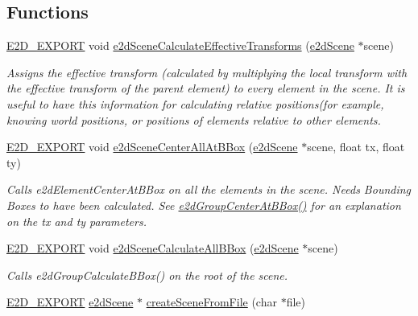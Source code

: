 \subsection*{Functions}
\begin{DoxyCompactItemize}
\item 
\hyperlink{Ez2DS_8h_a9f14e9cb869e1a85fdaba03afcca0df9}{E2\-D\-\_\-\-E\-X\-P\-O\-R\-T} void \hyperlink{group__e2dScene_ga6981f2448904c96723449cb84ffb4d8a}{e2d\-Scene\-Calculate\-Effective\-Transforms} (\hyperlink{structe2dScene}{e2d\-Scene} $\ast$scene)
\begin{DoxyCompactList}\small\item\em Assigns the effective transform (calculated by multiplying the local transform with the effective transform of the parent element) to every element in the scene. It is useful to have this information for calculating relative positions(for example, knowing world positions, or positions of elements relative to other elements. \end{DoxyCompactList}\item 
\hyperlink{Ez2DS_8h_a9f14e9cb869e1a85fdaba03afcca0df9}{E2\-D\-\_\-\-E\-X\-P\-O\-R\-T} void \hyperlink{group__e2dScene_ga1d33ba7ce041a68b061cfa6b0291b886}{e2d\-Scene\-Center\-All\-At\-B\-Box} (\hyperlink{structe2dScene}{e2d\-Scene} $\ast$scene, float tx, float ty)
\begin{DoxyCompactList}\small\item\em Calls e2d\-Element\-Center\-At\-B\-Box on all the elements in the scene. Needs Bounding Boxes to have been calculated. See \hyperlink{group__e2dGroup_ga2800a7dc3827e8753e2f2c6ef2e05eb9}{e2d\-Group\-Center\-At\-B\-Box()} for an explanation on the tx and ty parameters. \end{DoxyCompactList}\item 
\hyperlink{Ez2DS_8h_a9f14e9cb869e1a85fdaba03afcca0df9}{E2\-D\-\_\-\-E\-X\-P\-O\-R\-T} void \hyperlink{group__e2dScene_gaa202610ee0b2e5c47bded576b365c195}{e2d\-Scene\-Calculate\-All\-B\-Box} (\hyperlink{structe2dScene}{e2d\-Scene} $\ast$scene)
\begin{DoxyCompactList}\small\item\em Calls e2d\-Group\-Calculate\-B\-Box() on the root of the scene. \end{DoxyCompactList}\item 
\hyperlink{Ez2DS_8h_a9f14e9cb869e1a85fdaba03afcca0df9}{E2\-D\-\_\-\-E\-X\-P\-O\-R\-T} \hyperlink{structe2dScene}{e2d\-Scene} $\ast$ \hyperlink{group__e2dScene_ga9994e9f2692c5007b91d02c19350cd1b}{create\-Scene\-From\-File} (char $\ast$file)

\end{DoxyCompactItemize}
